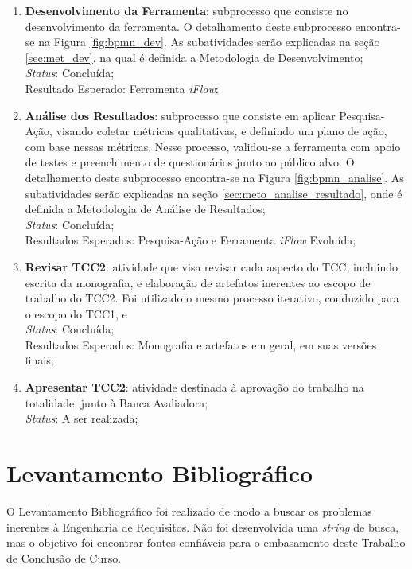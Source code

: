 \begin{enumerate}
    \item \textbf{Desenvolvimento da Ferramenta}: subprocesso que consiste no desenvolvimento da ferramenta. O detalhamento deste subprocesso encontra-se na Figura \ref{fig:bpmn_dev}. As subatividades serão explicadas na seção \ref{sec:met_dev}, na qual é definida a Metodologia de Desenvolvimento;
    \\
    \textit{Status}: Concluída;
    \\
    Resultado Esperado: Ferramenta \textit{iFlow};
    \item \textbf{Análise dos Resultados}: subprocesso que consiste em aplicar Pesquisa-Ação, visando coletar métricas qualitativas, e definindo um plano de ação, com base nessas métricas. Nesse processo, validou-se a ferramenta com apoio de testes e preenchimento de questionários junto ao público alvo. O detalhamento deste subprocesso encontra-se na Figura \ref{fig:bpmn_analise}. As subatividades serão explicadas na seção \ref{sec:meto_analise_resultado}, onde é definida a Metodologia de Análise de Resultados;
    \\
    \textit{Status}: Concluída;
    \\
    Resultados Esperados: Pesquisa-Ação e Ferramenta \textit{iFlow} Evoluída;
    \item \textbf{Revisar TCC2}: atividade que visa revisar cada aspecto do TCC, incluindo escrita da monografia, e elaboração de artefatos inerentes ao escopo de trabalho do TCC2. Foi utilizado o mesmo processo iterativo, conduzido para o escopo do TCC1, e
    \\
    \textit{Status}: Concluída;
    \\
    Resultados Esperados: Monografia e artefatos em geral, em suas versões finais;
    \item \textbf{Apresentar TCC2}: atividade destinada à aprovação do trabalho na totalidade, junto à Banca Avaliadora;
    \\
    \textit{Status}: A ser realizada;
\end{enumerate}

\section{Levantamento Bibliográfico}

\label{sec:levantamento_bibliografico}

O Levantamento Bibliográfico foi realizado de modo a buscar os problemas inerentes à Engenharia de Requisitos. Não foi desenvolvida uma \textit{string} de busca, mas o objetivo foi encontrar fontes confiáveis para o embasamento deste Trabalho de Conclusão de Curso.

